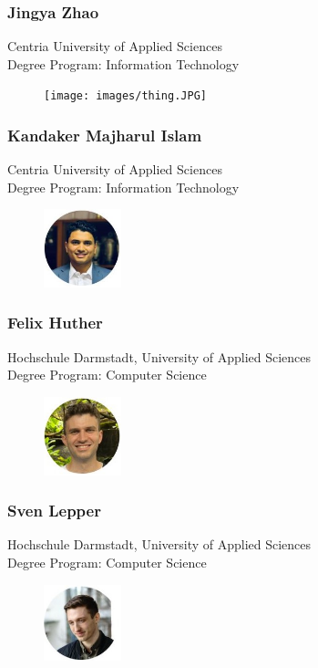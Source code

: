\subsubsection{Jingya Zhao}
Centria University of Applied Sciences \\
Degree Program: Information Technology
\begin{figure}[h]
    \centering
    \texttt{[image: images/thing.JPG]}
\end{figure}

\subsubsection{Kandaker Majharul Islam}
Centria University of Applied Sciences \\
Degree Program: Information Technology
\begin{figure}[h]
    \centering
    \includegraphics[width=0.2\textwidth]{images/ifty.JPG}
\end{figure}

\subsubsection{Felix Huther}
Hochschule Darmstadt, University of Applied Sciences \\
Degree Program: Computer Science
\begin{figure}[h]
    \centering
    \includegraphics[width=0.2\textwidth]{images/felix.JPG}
\end{figure}

\subsubsection{Sven Lepper}
Hochschule Darmstadt, University of Applied Sciences \\
Degree Program: Computer Science
\begin{figure}[h]
    \centering
    \includegraphics[width=0.2\textwidth]{images/sven.JPG}
\end{figure}

